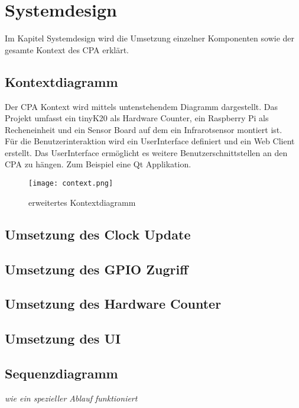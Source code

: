 \section{Systemdesign}
    Im Kapitel Systemdesign wird die Umsetzung einzelner Komponenten sowie der gesamte Kontext des CPA erklärt.
        \subsection{Kontextdiagramm}
        Der CPA Kontext wird mittels untenstehendem Diagramm dargestellt. Das Projekt umfasst ein tinyK20 als Hardware Counter, ein Raspberry Pi als Recheneinheit und ein Sensor Board auf dem ein Infrarotsensor montiert ist.\\
        Für die Benutzerinteraktion wird ein UserInterface definiert und ein Web Client erstellt. Das UserInterface ermöglicht es weitere Benutzerschnittstellen an den CPA zu hängen. Zum Beispiel eine Qt Applikation.
        \begin{figure}[H]
            \centering
            \texttt{[image: context.png]}
            \caption{erweitertes Kontextdiagramm}
        \end{figure}

    	\subsection{Umsetzung des Clock Update}
		\subsection{Umsetzung des GPIO Zugriff}
		\subsection{Umsetzung des Hardware Counter}
        
        \subsection{Umsetzung des UI}
		\subsection{Sequenzdiagramm}
			\textit{wie ein spezieller Ablauf funktioniert}
		
